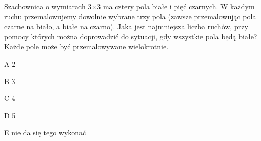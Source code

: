 \begin{tresc}
Szachownica o wymiarach 3×3 ma cztery pola białe i pięć czarnych. W każdym ruchu przemalowujemy dowolnie wybrane trzy pola (zawsze przemalowując pola czarne na biało, a białe na czarno). Jaka jest najmniejsza liczba ruchów, przy pomocy których można doprowadzić do sytuacji, gdy wszystkie pola będą białe? Każde pole może być przemalowywane wielokrotnie.
\end{tresc}
\begin{wariant}{A} 2 \end{wariant}
\begin{wariant}{B} 3 \end{wariant}
\begin{wariant}{C} 4 \end{wariant}
\begin{wariant}{D} 5 \end{wariant}
\begin{wariant}{E} nie da się tego wykonać \end{wariant}

